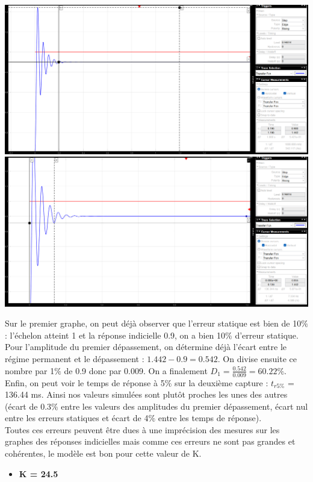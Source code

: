 \documentclass[12pt]{article}
\begin{document}
\begin{center}
    \includegraphics[width = 16 cm]{TP2 Simulink/Syst_2/Depass_4_1_K=4.5.png}
    \includegraphics[width = 16 cm]{TP2 Simulink/Syst_2/tr5prct_4_1_K=4.5.png}
\end{center}
    Sur le premier graphe, on peut déjà observer que l'erreur statique est bien de 10$\%$ : l'échelon atteint 1 et la réponse indicielle 0.9, on a bien 10$\%$ d'erreur statique.
    Pour l'amplitude du premier dépassement, on détermine déjà l'écart entre le régime permanent et le dépassement : $1.442 -0.9 = 0.542$. On divise ensuite ce nombre par 1$\%$ de 0.9 donc par 0.009.
    On a finalement $D_1 = \frac{0.542}{0.009} = 60.22\%$. Enfin, on peut voir le temps de réponse à 5$\%$ sur la deuxième capture : $t_{r5\%}$ = 136.44 ms.
    Ainsi nos valeurs simulées sont plutôt proches les unes des autres (écart de 0.3$\%$ entre les valeurs des amplitudes du premier dépassement, écart nul entre les erreurs statiques et écart de 4$\%$ entre les temps de réponse). 
    \\Toutes ces erreurs peuvent être dues à une imprécision des mesures sur les graphes des réponses indicielles mais comme ces erreurs ne sont pas grandes et cohérentes, le modèle est bon pour cette valeur de K.
\begin{itemize}
    \item \bf \large K = 24.5
\end{itemize}
\end{document}
